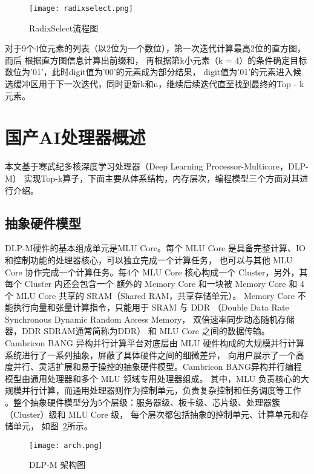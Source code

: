 \begin{figure}[ht]
    \centering
    \texttt{[image: radixselect.png]}
    \caption{RadixSelect流程图}
    \label{fig:radixselect}
\end{figure}

对于9个4位元素的列表（以2位为一个数位），第一次迭代计算最高2位的直方图，而后
根据直方图信息计算出前缀和，
再根据第k小元素（k = 4）的条件确定目标数位为'01'，此时digit值为'00'的元素成为部分结果，
digit值为'01'的元素进入候选缓冲区用于下一次迭代，同时更新k和n，继续后续迭代直至找到最终的Top - k元素。




\section{国产AI处理器概述}
本文基于寒武纪多核深度学习处理器（Deep Learning Processor-Multicore，DLP-M）
实现Top-k算子，下面主要从体系结构，内存层次，编程模型三个方面对其进行介绍。
\subsection{抽象硬件模型}
DLP-M硬件的基本组成单元是MLU Core。每个 MLU Core 是具备完整计算、IO和控制功能的处理器核心，可以独立完成一个计算任务，
也可以与其他 MLU Core 协作完成一个计算任务。每4个 MLU Core 核心构成一个 Cluster，另外，其每个 Cluster 内还会包含一个
额外的 Memory Core 和一块被 Memory Core 和 4 个 MLU Core 共享的 SRAM（Shared RAM，共享存储单元）。
Memory Core 不能执行向量和张量计算指令，只能用于 SRAM 与 DDR （Double Data Rate Synchronous Dynamic Random Access Memory，
双倍速率同步动态随机存储器，DDR SDRAM通常简称为DDR） 和 MLU Core 之间的数据传输。
Cambricon BANG 异构并行计算平台对底层由 MLU 硬件构成的大规模并行计算系统进行了一系列抽象，屏蔽了具体硬件之间的细微差异，
向用户展示了一个高度并行、灵活扩展和易于操控的抽象硬件模型。Cambricon BANG异构并行编程模型由通用处理器和多个 MLU 领域专用处理器组成。
其中，MLU 负责核心的大规模并行计算，而通用处理器则作为控制单元，负责复杂控制和任务调度等工作
。整个抽象硬件模型分为5个层级：服务器级、板卡级、芯片级、处理器簇（Cluster）级和 MLU Core 级，
每个层次都包括抽象的控制单元、计算单元和存储单元，
如图~\ref{fig:arch}所示。
\begin{figure}[ht]
    \centering
    \texttt{[image: arch.png]}
    \caption{DLP-M 架构图}
    \label{fig:arch}
    \note{}
  \end{figure}

